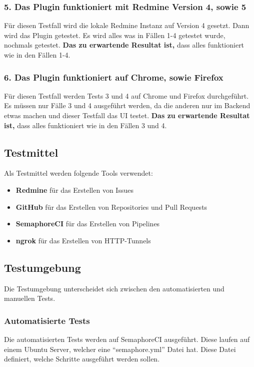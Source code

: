 \subsubsection{5. Das Plugin funktioniert mit Redmine Version 4, sowie 5}
Für diesen Testfall wird die lokale Redmine Instanz auf Version 4 gesetzt. Dann wird das Plugin getestet. Es wird
alles was in Fällen 1-4 getestet wurde, nochmals getestet. \newline
\textbf{Das zu erwartende Resultat ist,} dass alles funktioniert wie in den Fällen 1-4.

\subsubsection{6. Das Plugin funktioniert auf Chrome, sowie Firefox}
Für diesen Testfall werden Tests 3 und 4 auf Chrome und Firefox durchgeführt. Es müssen nur Fälle 3 und 4
ausgeführt werden, da die anderen nur im Backend etwas machen und dieser Testfall das UI testet. \newline
\textbf{Das zu erwartende Resultat ist,} dass alles funktioniert wie in den Fällen 3 und 4.

\subsection{Testmittel}
Als Testmittel werden folgende Tools verwendet:
\begin{itemize}
  \item \textbf{Redmine} für das Erstellen von Issues
  \item \textbf{GitHub} für das Erstellen von Repositories und Pull Requests
  \item \textbf{SemaphoreCI} für das Erstellen von Pipelines
  \item \textbf{ngrok} für das Erstellen von HTTP-Tunnels
\end{itemize}

\subsection{Testumgebung}
Die Testumgebung unterscheidet sich zwischen den automatisierten und manuellen Tests.
\subsubsection{Automatisierte Tests}
Die automatisierten Tests werden auf SemaphoreCI ausgeführt. Diese laufen auf einem Ubuntu Server, welcher eine
\enquote{semaphore.yml} Datei hat. Diese Datei definiert, welche Schritte ausgeführt werden sollen.
